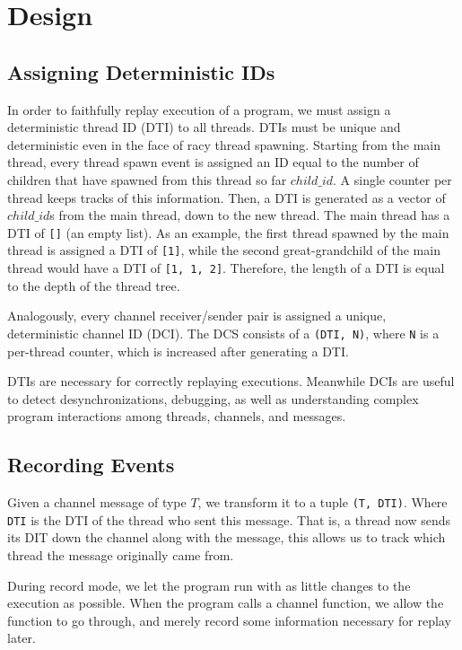 \section{Design}
\subsection{Assigning Deterministic IDs}
In order to faithfully replay execution of a program, we must assign a deterministic
thread ID (DTI) to all threads. DTIs must be unique and deterministic
even in the face of racy thread spawning. Starting from the main thread,
every thread spawn event is assigned an ID equal to the number of children that
have spawned from this thread so far $child\_id$. A single counter per thread keeps tracks of this information. Then, a DTI is generated as a vector of $child\_id$s from the main thread, down to the new thread. The main thread has a DTI of \texttt{[]} (an empty list). As an example, the first thread spawned by the main thread is assigned a DTI of \texttt{[1]}, while the second great-grandchild of the main thread would have a DTI of \texttt{[1, 1, 2]}. Therefore, the length of a DTI is equal to the depth of the thread tree.

Analogously, every channel receiver/sender pair is assigned a unique, deterministic channel ID (DCI).
The DCS consists of a \texttt{(DTI, N)}, where \texttt{N} is a per-thread
counter, which is increased after generating a DTI.

DTIs are necessary for correctly replaying executions. Meanwhile DCIs are useful to detect
desynchronizations, debugging, as well as understanding complex program interactions among
threads, channels, and messages.

\subsection{Recording Events}
Given a channel message of type $T$, we transform it to a tuple \texttt{(T, DTI)}. Where \texttt{DTI} is
the DTI of the thread who sent this message. That is, a thread now sends its DIT down
the channel along with the message, this allows us to track which thread the message
originally came from.

During record mode, we let the program run with as little changes to the execution as
possible. When the program calls a channel function, we allow the function to go through, and merely record some information necessary for replay later.


